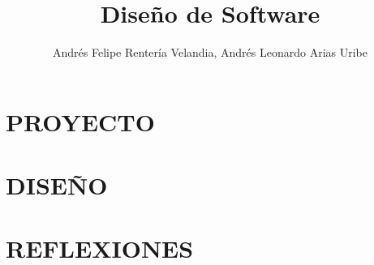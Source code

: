 \documentclass[11pt,letterpaper]{book}
\title{Diseño de Software}
\author{Andrés Felipe Rentería Velandia, Andrés Leonardo Arias Uribe}
\begin{document}
\maketitle
\tableofcontents
\listoffigures

\part{PROYECTO}


\part{DISEÑO}








\part{REFLEXIONES}



\end{document}
